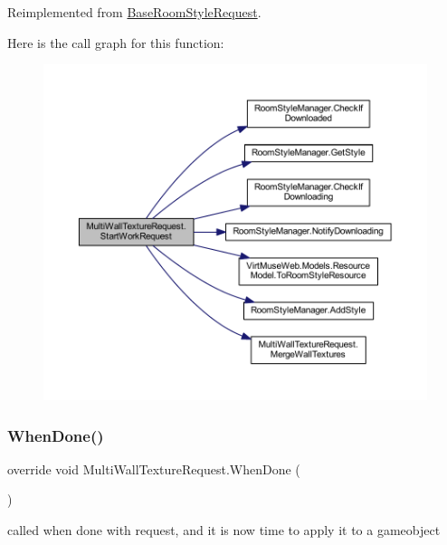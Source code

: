 Reimplemented from \mbox{\hyperlink{class_base_room_style_request_af2ac2de206ad154351cf6a1b1e7befd5}{Base\+Room\+Style\+Request}}.

Here is the call graph for this function\+:
\nopagebreak
\begin{figure}[H]
\begin{center}
\leavevmode
\includegraphics[width=350pt]{class_multi_wall_texture_request_a9990230b6a9cb6be581b7948f379065b_cgraph}
\end{center}
\end{figure}
\mbox{\label{class_multi_wall_texture_request_a96afd031b54eb8f09658fa1930b7d7f7}} 
\subsubsection{\texorpdfstring{When\+Done()}{WhenDone()}}
{\footnotesize\ttfamily override void Multi\+Wall\+Texture\+Request.\+When\+Done (\begin{DoxyParamCaption}{ }\end{DoxyParamCaption})\hspace{0.3cm}{\ttfamily [virtual]}}



called when done with request, and it is now time to apply it to a gameobject 



